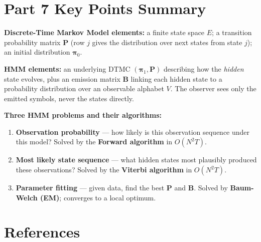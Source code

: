 \documentclass[12pt, a4paper]{article}
\begin{document}
\section*{Part 7 \quad Key Points Summary}

\begin{keybox}
  \textbf{Discrete-Time Markov Model elements:}
  a finite state space $E$; a transition probability matrix $\mathbf{P}$
  (row $j$ gives the distribution over next states from state $j$); an
  initial distribution $\boldsymbol{\pi}_0$.
\end{keybox}

\begin{keybox}
  \textbf{HMM elements:}
  an underlying DTMC $(\boldsymbol{\pi}_1, \mathbf{P})$ describing how the
  \emph{hidden} state evolves, plus an emission matrix $\mathbf{B}$ linking
  each hidden state to a probability distribution over an observable alphabet
  $V$. The observer sees only the emitted symbols, never the states directly.
\end{keybox}

\begin{keybox}
  \textbf{Three HMM problems and their algorithms:}
  \begin{enumerate}[leftmargin=1.4em, itemsep=3pt]
    \item \textbf{Observation probability} --- how likely is this observation
      sequence under this model? Solved by the \textbf{Forward algorithm}
      in $O(N^2 T)$.
    \item \textbf{Most likely state sequence} --- what hidden states most
      plausibly produced these observations? Solved by the \textbf{Viterbi
      algorithm} in $O(N^2 T)$.
    \item \textbf{Parameter fitting} --- given data, find the best $\mathbf{P}$
      and $\mathbf{B}$. Solved by \textbf{Baum-Welch (EM)}; converges to a
      local optimum.
  \end{enumerate}
\end{keybox}

\section*{References}
\end{document}
